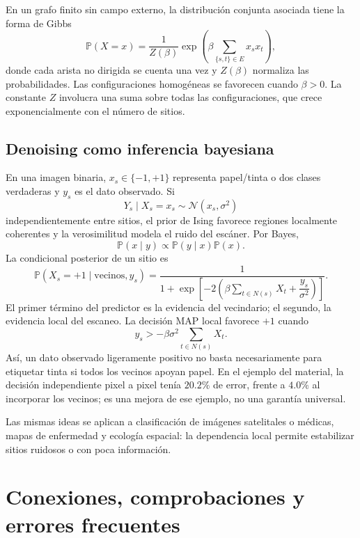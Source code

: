 \documentclass[11pt,oneside]{article}
\newcommand{\Prob}{\mathbb{P}}
\newcommand{\1}{\mathbf{1}}
\begin{document}
En un grafo finito sin campo externo, la distribución conjunta asociada tiene la forma de Gibbs
\[
\Prob(X=x)=\frac{1}{Z(\beta)}
\exp\left(\beta\sum_{\{s,t\}\in E}x_sx_t\right),
\]
donde cada arista no dirigida se cuenta una vez y $Z(\beta)$ normaliza las probabilidades. Las configuraciones homogéneas se favorecen cuando $\beta>0$. La constante $Z$ involucra una suma sobre todas las configuraciones, que crece exponencialmente con el número de sitios.

\subsection{Denoising como inferencia bayesiana}

En una imagen binaria, $x_s\in\{-1,+1\}$ representa papel/tinta o dos clases verdaderas y $y_s$ es el dato observado. Si
\[
Y_s\mid X_s=x_s\sim\mathcal{N}(x_s,\sigma^2)
\]
independientemente entre sitios, el prior de Ising favorece regiones localmente coherentes y la verosimilitud modela el ruido del escáner. Por Bayes,
\[
\Prob(x\mid y)\propto \Prob(y\mid x)\Prob(x).
\]
La condicional posterior de un sitio es
\[
\boxed{\Prob(X_s=+1\mid\text{vecinos},y_s)
 =\frac{1}{1+\exp\left[-2\left(\beta\sum_{t\in N(s)}X_t+
 \dfrac{y_s}{\sigma^2}\right)\right]}.}
\]
El primer término del predictor es la evidencia del vecindario; el segundo, la evidencia local del escaneo. La decisión MAP local favorece $+1$ cuando
\[
y_s>-\beta\sigma^2\sum_{t\in N(s)}X_t.
\]
Así, un dato observado ligeramente positivo no basta necesariamente para etiquetar tinta si todos los vecinos apoyan papel. En el ejemplo del material, la decisión independiente pixel a pixel tenía $20.2\%$ de error, frente a $4.0\%$ al incorporar los vecinos; es una mejora de ese ejemplo, no una garantía universal.

Las mismas ideas se aplican a clasificación de imágenes satelitales o médicas, mapas de enfermedad y ecología espacial: la dependencia local permite estabilizar sitios ruidosos o con poca información.

\section{Conexiones, comprobaciones y errores frecuentes}
\end{document}
